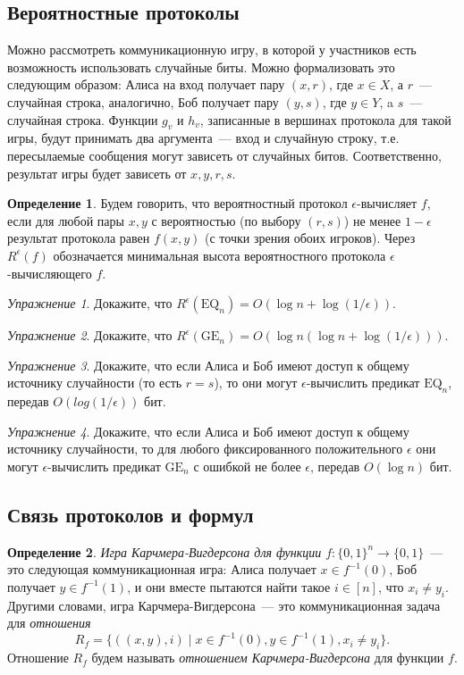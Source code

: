 \documentclass[12pt]{article}
\theoremstyle{definition}
\newtheorem{definition}{Определение}[section]
\theoremstyle{plain}
\theoremstyle{remark}
\newtheorem{exercise}{Упражнение}[section]
\begin{document}
\subsection{Вероятностные протоколы}
Можно рассмотреть коммуникационную игру, в которой у участников есть возможность
использовать случайные биты. Можно формализовать это следующим образом: Алиса на 
вход получает пару $(x,r)$, где $x\in X$, а $r$~--- случайная строка, аналогично,
Боб получает пару $(y,s)$, где $y\in Y$, a $s$~--- случайная строка. Функции $g_v$ и $h_v$, записанные в вершинах протокола для такой игры, будут принимать два аргумента~--- вход и случайную строку, т.е. пересылаемые сообщения
могут зависеть от случайных битов. Соответственно, результат игры  будет зависеть от $x,y,r,s$.

\begin{definition}
Будем говорить, что вероятностный
протокол $\epsilon$-вычисляет $f$, если для любой пары $x,y$ с вероятностью (по выбору $(r,s)$) не менее $1-\epsilon$ результат протокола равен $f(x,y)$ (с точки зрения обоих игроков). Через $R^\epsilon(f)$ обозначается минимальная высота вероятностного протокола $\epsilon$-вычисляющего $f$.
\end{definition}
\begin{exercise}
Докажите, что $R^\epsilon(\mathrm{EQ}_n) = O(\log n + \log(1/\epsilon))$.
\end{exercise}
\begin{exercise}
Докажите, что $R^\epsilon(\mathrm{GE}_n) = O(\log n(\log n + \log(1/\epsilon)))$.
\end{exercise}
\begin{exercise}
Докажите, что если Алиса и Боб имеют доступ к общему источнику случайности (то есть $r=s$), то они могут $\epsilon$-вычислить предикат $\mathrm{EQ}_n$, передав $O(log(1/\epsilon))$ бит.
\end{exercise}
\begin{exercise}
Докажите, что если Алиса и Боб имеют доступ к общему источнику случайности, то для любого фиксированного положительного $\epsilon$ они могут $\epsilon$-вычислить предикат $\mathrm{GE}_n$ с ошибкой не более $\epsilon$, передав $O(\log n)$ бит.
\end{exercise}

\subsection{Связь протоколов и формул}
\begin{definition}  
    \emph{Игра Карчмера-Вигдерсона для функции $f : \{0,1\}^n \to \{0,1\}$}~--- это 
    следующая коммуникационная игра: Алиса получает $x\in f^{-1}(0)$, Боб получает 
    $y\in f^{-1}(1)$, и они вместе пытаются найти такое $i\in [n]$, что $x_i \neq y_i$. 
    Другими словами, игра Карчмера-Вигдерсона~--- это коммуникационная задача для 
    \emph{отношения} $$R_f = \{((x,y),i)\mid x\in f^{-1}(0), y\in f^{-1}(1), x_i\neq y_i\}.$$
    Отношение $R_f$ будем называть \emph{отношением Карчмера-Вигдерсона} для функции $f$.
\end{definition}
\end{document}
